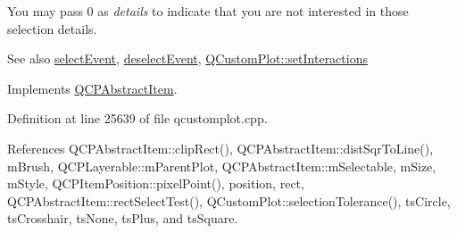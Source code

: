 You may pass 0 as {\itshape details} to indicate that you are not interested in those selection details.

\begin{DoxySeeAlso}{See also}
\hyperlink{class_q_c_p_abstract_item_aaf92af7b9893712959a6c073d334d88d}{select\+Event}, \hyperlink{class_q_c_p_abstract_item_a91f090d6763cfedb0749219c63788ae9}{deselect\+Event}, \hyperlink{class_q_custom_plot_a5ee1e2f6ae27419deca53e75907c27e5}{Q\+Custom\+Plot\+::set\+Interactions} 
\end{DoxySeeAlso}


Implements \hyperlink{class_q_c_p_abstract_item_a96d522d10ffc0413b9a366c6f7f0476b}{Q\+C\+P\+Abstract\+Item}.



Definition at line 25639 of file qcustomplot.\+cpp.



References Q\+C\+P\+Abstract\+Item\+::clip\+Rect(), Q\+C\+P\+Abstract\+Item\+::dist\+Sqr\+To\+Line(), m\+Brush, Q\+C\+P\+Layerable\+::m\+Parent\+Plot, Q\+C\+P\+Abstract\+Item\+::m\+Selectable, m\+Size, m\+Style, Q\+C\+P\+Item\+Position\+::pixel\+Point(), position, rect, Q\+C\+P\+Abstract\+Item\+::rect\+Select\+Test(), Q\+Custom\+Plot\+::selection\+Tolerance(), ts\+Circle, ts\+Crosshair, ts\+None, ts\+Plus, and ts\+Square.


